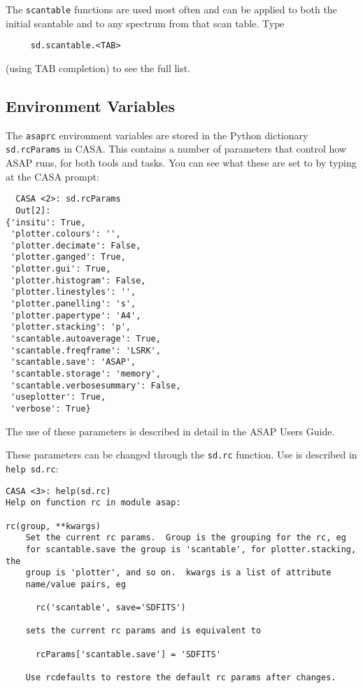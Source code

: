 The {\tt scantable} functions are used most often and can be applied
to both the initial scantable and to any spectrum from that scan
table.  Type
\small
\begin{verbatim}
     sd.scantable.<TAB>
\end{verbatim}
\normalsize
(using TAB completion) to see the full list. 

\subsection{Environment Variables}
\label{subsection:sd.asap.environ}

The {\tt asaprc} environment variables are stored in the Python
dictionary {\tt sd.rcParams} in CASA.  This contains a number
of parameters that control how ASAP runs, for both tools and
tasks.  You can see what these are set to by typing at the
CASA prompt:

\small
\begin{verbatim}
  CASA <2>: sd.rcParams
  Out[2]: 
{'insitu': True,
 'plotter.colours': '',
 'plotter.decimate': False,
 'plotter.ganged': True,
 'plotter.gui': True,
 'plotter.histogram': False,
 'plotter.linestyles': '',
 'plotter.panelling': 's',
 'plotter.papertype': 'A4',
 'plotter.stacking': 'p',
 'scantable.autoaverage': True,
 'scantable.freqframe': 'LSRK',
 'scantable.save': 'ASAP',
 'scantable.storage': 'memory',
 'scantable.verbosesummary': False,
 'useplotter': True,
 'verbose': True}
\end{verbatim}
\normalsize

The use of these parameters is described in detail in the
ASAP Users Guide.

These parameters can be changed through the {\tt sd.rc}
function.  Use is described in {\tt help sd.rc}:

\small
\begin{verbatim}
CASA <3>: help(sd.rc)
Help on function rc in module asap:

rc(group, **kwargs)
    Set the current rc params.  Group is the grouping for the rc, eg
    for scantable.save the group is 'scantable', for plotter.stacking, the
    group is 'plotter', and so on.  kwargs is a list of attribute
    name/value pairs, eg
    
      rc('scantable', save='SDFITS')
    
    sets the current rc params and is equivalent to
    
      rcParams['scantable.save'] = 'SDFITS'
    
    Use rcdefaults to restore the default rc params after changes.
\end{verbatim}
\normalsize

